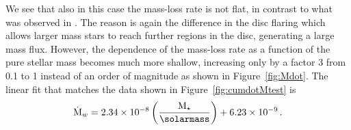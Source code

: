 \documentclass[usenatbib,useAMS,usedcolumn]{mnras}
\begin{document}
We see that also in this case the mass-loss rate is not flat, in contrast to what was observed in . The reason is again the difference in the disc flaring which allows larger mass stars to reach further regions in the disc, generating a large mass flux. However, the dependence of the mass-loss rate as a function of the pure stellar mass becomes much more shallow, increasing only by a factor $3$ from \SI{0.1}{\solarmass} to \SI{1}{\solarmass} instead of an order of magnitude as shown in Figure~\ref{fig:Mdot}.
The linear fit that matches the data shown in Figure~\ref{fig:cumdotMtest} is
\begin{equation}
    \dot{\mathrm{M}}_w = 2.34 \times 10^{-8} \left(\frac{\mathrm{M}_\star}{\si{\solarmass}}\right) + 6.23 \times 10^{-9}\,.
\end{equation}

\end{document}
